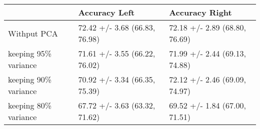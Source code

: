\begin{tabular}{lll}
\toprule
{} &                  Accuracy Left &                 Accuracy Right \\
\midrule
Withput PCA          &  72.42 +/- 3.68 (66.83, 76.98) &  72.18 +/- 2.89 (68.80, 76.69) \\
keeping 95\% variance &  71.61 +/- 3.55 (66.22, 76.02) &  71.99 +/- 2.44 (69.13, 74.88) \\
keeping 90\% variance &  70.92 +/- 3.34 (66.35, 75.39) &  72.12 +/- 2.46 (69.09, 74.97) \\
keeping 80\% variance &  67.72 +/- 3.63 (63.32, 71.62) &  69.52 +/- 1.84 (67.00, 71.51) \\
\bottomrule
\end{tabular}
